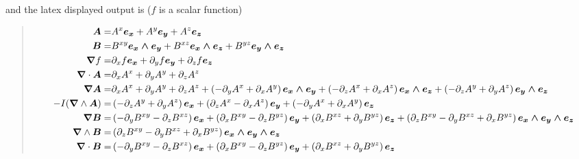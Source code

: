 \documentclass[letterpaper,10pt,english]{sphinxmanual}
\begin{document}
and the latex displayed output is ($f$ is a scalar function)
\begin{quote}
  \begin{align*}
  \boldsymbol{A} =& A^{x}\boldsymbol{e_{x}}+A^{y}\boldsymbol{e_{y}}+A^{z}\boldsymbol{e_{z}} \\
  \boldsymbol{B} =& B^{xy}\boldsymbol{e_{x}\wedge e_{y}}+B^{xz}\boldsymbol{e_{x}\wedge e_{z}}+B^{yz}\boldsymbol{e_{y}\wedge e_{z}} \\
  \boldsymbol{\nabla}  f =& \partial_{x} f\boldsymbol{e_{x}}+\partial_{y} f\boldsymbol{e_{y}}+\partial_{z} f\boldsymbol{e_{z}} \\
  \boldsymbol{\nabla} \cdot \boldsymbol{A} = &\partial_{x} A^{x} + \partial_{y} A^{y} + \partial_{z} A^{z} \\
  \boldsymbol{\nabla}  \boldsymbol{A} = &\partial_{x} A^{x} + \partial_{y} A^{y} + \partial_{z} A^{z}+\left ( - \partial_{y} A^{x} + \partial_{x} A^{y}\right ) \boldsymbol{e_{x}\wedge e_{y}}+\left ( - \partial_{z} A^{x} + \partial_{x} A^{z}\right ) \boldsymbol{e_{x}\wedge e_{z}}+\left ( - \partial_{z} A^{y} + \partial_{y} A^{z}\right ) \boldsymbol{e_{y}\wedge e_{z}} \\
  -I (\boldsymbol{\nabla} \wedge \boldsymbol{A}) = &\left ( - \partial_{z} A^{y} + \partial_{y} A^{z}\right ) \boldsymbol{e_{x}}+\left ( \partial_{z} A^{x} - \partial_{x} A^{z}\right ) \boldsymbol{e_{y}}+\left ( - \partial_{y} A^{x} + \partial_{x} A^{y}\right ) \boldsymbol{e_{z}} \\
  \boldsymbol{\nabla}  \boldsymbol{B} = &\left ( - \partial_{y} B^{xy} - \partial_{z} B^{xz}\right ) \boldsymbol{e_{x}}+\left ( \partial_{x} B^{xy} - \partial_{z} B^{yz}\right ) \boldsymbol{e_{y}}+\left ( \partial_{x} B^{xz} + \partial_{y} B^{yz}\right ) \boldsymbol{e_{z}}+\left ( \partial_{z} B^{xy} - \partial_{y} B^{xz} + \partial_{x} B^{yz}\right ) \boldsymbol{e_{x}\wedge e_{y}\wedge e_{z}} \\
  \boldsymbol{\nabla} \wedge \boldsymbol{B} = &\left ( \partial_{z} B^{xy} - \partial_{y} B^{xz} + \partial_{x} B^{yz}\right ) \boldsymbol{e_{x}\wedge e_{y}\wedge e_{z}} \\
  \boldsymbol{\nabla} \cdot \boldsymbol{B} = &\left ( - \partial_{y} B^{xy} - \partial_{z} B^{xz}\right ) \boldsymbol{e_{x}}+\left ( \partial_{x} B^{xy} - \partial_{z} B^{yz}\right ) \boldsymbol{e_{y}}+\left ( \partial_{x} B^{xz} + \partial_{y} B^{yz}\right ) \boldsymbol{e_{z}}
  \end{align*}\end{quote}
\end{document}
